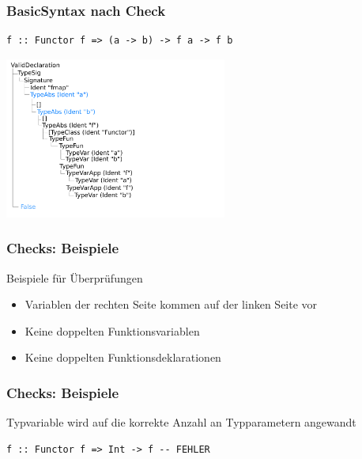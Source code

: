 \documentclass{beamer}
\begin{document}

\begin{frame}[fragile]
\frametitle{BasicSyntax nach Check}
\begin{verbatim}
f :: Functor f => (a -> b) -> f a -> f b
\end{verbatim}

\begin{center}
\includegraphics[height=200px]{ast-simple-checked}
\end{center}
\end{frame}


\begin{frame}
\frametitle{Checks: Beispiele}

Beispiele für Überprüfungen

\begin{itemize}
\item Variablen der rechten Seite kommen auf der linken Seite vor
\item Keine doppelten Funktionsvariablen
\item Keine doppelten Funktionsdeklarationen
\end{itemize}

\end{frame}


\begin{frame}[fragile]
\frametitle{Checks: Beispiele}

Typvariable wird auf die korrekte Anzahl an Typparametern angewandt

\begin{verbatim}
f :: Functor f => Int -> f -- FEHLER
\end{verbatim}

\end{frame}
\end{document}
